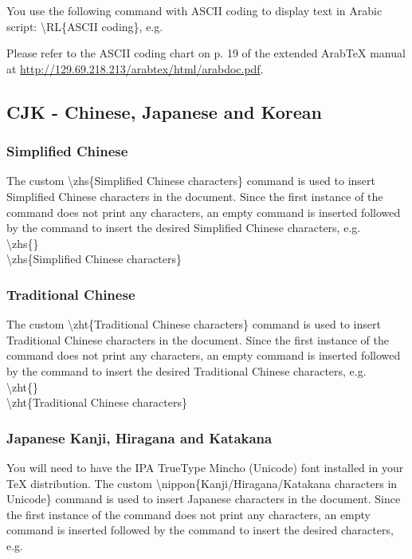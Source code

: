 \documentclass[12pt]{MUNThesisBibTeX}
\newcommand{\zhs}[1]{\begin{CJK}{UTF8}{gbsn}#1\end{CJK}}
\newcommand{\zht}[1]{\begin{CJK}{UTF8}{bsmi}#1\end{CJK}}
\begin{document}
You use the following command with ASCII coding to display text in Arabic script: \textbackslash RL\{ASCII coding\}, e.g.

Please refer to the ASCII coding chart on p. 19 of the extended ArabTeX manual at \url{http://129.69.218.213/arabtex/html/arabdoc.pdf}.

\subsection{CJK - Chinese, Japanese and Korean}
\selectfont

\subsubsection{Simplified Chinese}
The custom \textbackslash zhs\{Simplified Chinese characters\} command is used to insert Simplified Chinese characters in the document. Since the first instance of the command does not print any characters, an empty command is inserted followed by the command to insert the desired Simplified Chinese characters, e.g.\\

 \textbackslash zhs\{\}\\
 \textbackslash zhs\{Simplified Chinese characters\}\\


\subsubsection{Traditional Chinese}
The custom \textbackslash zht\{Traditional Chinese characters\} command is used to insert Traditional Chinese characters in the document. Since the first instance of the command does not print any characters, an empty command is inserted followed by the command to insert the desired Traditional Chinese characters, e.g.\\

 \textbackslash zht\{\}\\
 \textbackslash zht\{Traditional Chinese characters\}\\


\subsubsection{Japanese Kanji, Hiragana and Katakana}
You will need to have the IPA TrueType Mincho (Unicode) font installed in your TeX distribution. The custom \textbackslash nippon\{Kanji/Hiragana/Katakana characters in Unicode\} command is used to insert Japanese characters in the document. Since the first instance of the command does not print any characters, an empty command is inserted followed by the command to insert the desired characters, e.g.\\
\end{document}
